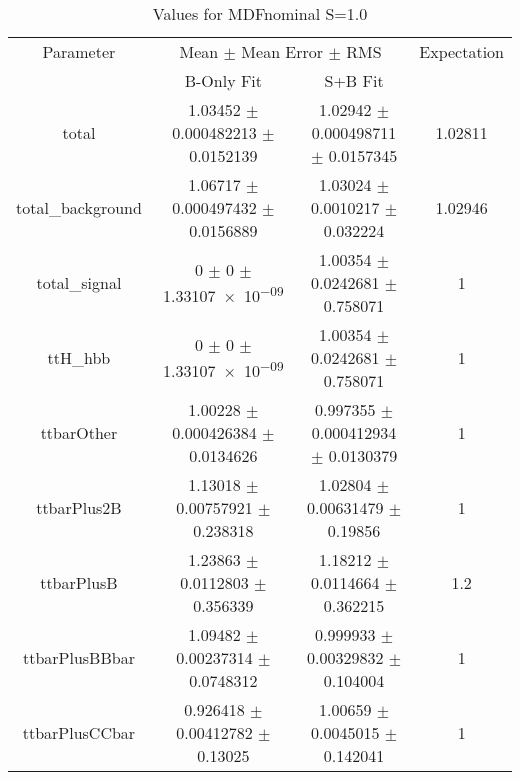 \begin{table}
\centering
\caption{Values for MDFnominal S=1.0}
\begin{tabular}{cccc}
\toprule
Parameter & \multicolumn{2}{c}{Mean $\pm$ Mean Error $\pm$ RMS} & Expectation\\
 & B-Only Fit & S+B Fit & \\
\midrule
total & \num{1.03452} $\pm$ \num{0.000482213} $\pm$ \num{0.0152139} & \num{1.02942} $\pm$ \num{0.000498711} $\pm$ \num{0.0157345} & \num{1.02811}\\
total\_background & \num{1.06717} $\pm$ \num{0.000497432} $\pm$ \num{0.0156889} & \num{1.03024} $\pm$ \num{0.0010217} $\pm$ \num{0.032224} & \num{1.02946}\\
total\_signal & \num{0} $\pm$ \num{0} $\pm$ \num{1.33107e-09} & \num{1.00354} $\pm$ \num{0.0242681} $\pm$ \num{0.758071} & \num{1}\\
ttH\_hbb & \num{0} $\pm$ \num{0} $\pm$ \num{1.33107e-09} & \num{1.00354} $\pm$ \num{0.0242681} $\pm$ \num{0.758071} & \num{1}\\
ttbarOther & \num{1.00228} $\pm$ \num{0.000426384} $\pm$ \num{0.0134626} & \num{0.997355} $\pm$ \num{0.000412934} $\pm$ \num{0.0130379} & \num{1}\\
ttbarPlus2B & \num{1.13018} $\pm$ \num{0.00757921} $\pm$ \num{0.238318} & \num{1.02804} $\pm$ \num{0.00631479} $\pm$ \num{0.19856} & \num{1}\\
ttbarPlusB & \num{1.23863} $\pm$ \num{0.0112803} $\pm$ \num{0.356339} & \num{1.18212} $\pm$ \num{0.0114664} $\pm$ \num{0.362215} & \num{1.2}\\
ttbarPlusBBbar & \num{1.09482} $\pm$ \num{0.00237314} $\pm$ \num{0.0748312} & \num{0.999933} $\pm$ \num{0.00329832} $\pm$ \num{0.104004} & \num{1}\\
ttbarPlusCCbar & \num{0.926418} $\pm$ \num{0.00412782} $\pm$ \num{0.13025} & \num{1.00659} $\pm$ \num{0.0045015} $\pm$ \num{0.142041} & \num{1}\\
\bottomrule
\end{tabular}
\end{table}
